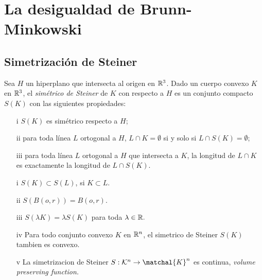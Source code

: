 \chapter{La desigualdad de Brunn-Minkowski}



\section{Simetrización de Steiner} %


\begin{defi}
    Sea $H$ un hiperplano que intersecta al origen en $\mathbb{R}^3$. Dado un cuerpo convexo $K$ en $\mathbb{R}^3$, el \textit{simétrico de Steiner} de $K$ con respecto a $H$ es un conjunto compacto $S(K)$ con las siguientes propiedades:
    \begin{itemize}
        \item[i] $S(K)$ es simétrico respecto a $H$;
        \item[ii] para toda línea $L$ ortogonal a $H$, $L \cap K = \emptyset$ si y solo si $L \cap S(K) = \emptyset$;
        \item[iii] para toda línea $L$ ortogonal a $H$ que intersecta a $K$, la longitud de $L \cap K $ es exactamente la longitud de $L \cap S(K).$
    \end{itemize}
\end{defi}


\begin{teo}
    \begin{itemize}
        \item[i] $S(K) \subset S(L)$, si $K \subset L.$
        \item[ii] $S(B(o,r)) = B(o,r).$
        \item[iii] $S(\lambda K) = \lambda S(K)$ para toda $\lambda \in \mathbb{R}.$
        \item[iv] Para todo conjunto convexo $K$ en $\mathbb{R}^n$, el simetrico de Steiner $S(K)$ tambien es convexo.
        \item[v] La simetrizacion de Steiner $S: \mathcal{K}^n \rightarrow \matchal{K}^n$ es continua, \textit{volume preserving function.}
    \end{itemize}
\end{teo}
    